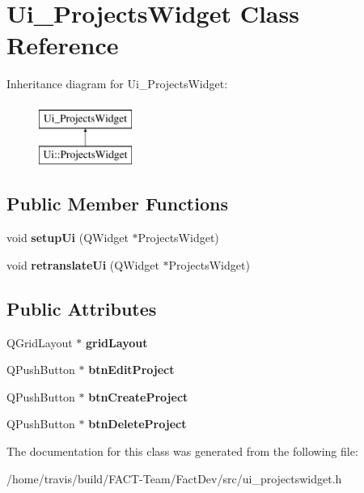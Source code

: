 \hypertarget{classUi__ProjectsWidget}{\section{Ui\-\_\-\-Projects\-Widget Class Reference}
\label{classUi__ProjectsWidget}
}
Inheritance diagram for Ui\-\_\-\-Projects\-Widget\-:\begin{figure}[H]
\begin{center}
\leavevmode
\includegraphics[height=2.000000cm]{d3/de9/classUi__ProjectsWidget}
\end{center}
\end{figure}
\subsection*{Public Member Functions}
\begin{DoxyCompactItemize}
\item 
\hypertarget{classUi__ProjectsWidget_a1235d2b943e3bea6f29ef3f060e10f99}{void {\bfseries setup\-Ui} (Q\-Widget $\ast$Projects\-Widget)}\label{classUi__ProjectsWidget_a1235d2b943e3bea6f29ef3f060e10f99}

\item 
\hypertarget{classUi__ProjectsWidget_ab26818ec75647661d182cc5725b8f439}{void {\bfseries retranslate\-Ui} (Q\-Widget $\ast$Projects\-Widget)}\label{classUi__ProjectsWidget_ab26818ec75647661d182cc5725b8f439}

\end{DoxyCompactItemize}
\subsection*{Public Attributes}
\begin{DoxyCompactItemize}
\item 
\hypertarget{classUi__ProjectsWidget_a78754d07bf4085e234a2857c9343a29d}{Q\-Grid\-Layout $\ast$ {\bfseries grid\-Layout}}\label{classUi__ProjectsWidget_a78754d07bf4085e234a2857c9343a29d}

\item 
\hypertarget{classUi__ProjectsWidget_abbf777ecb1d54dbc83be59c5916eb665}{Q\-Push\-Button $\ast$ {\bfseries btn\-Edit\-Project}}\label{classUi__ProjectsWidget_abbf777ecb1d54dbc83be59c5916eb665}

\item 
\hypertarget{classUi__ProjectsWidget_aa77ac175c580bcae8297eb19296e670b}{Q\-Push\-Button $\ast$ {\bfseries btn\-Create\-Project}}\label{classUi__ProjectsWidget_aa77ac175c580bcae8297eb19296e670b}

\item 
\hypertarget{classUi__ProjectsWidget_a5a2b448467d9601003be317169892f68}{Q\-Push\-Button $\ast$ {\bfseries btn\-Delete\-Project}}\label{classUi__ProjectsWidget_a5a2b448467d9601003be317169892f68}

\end{DoxyCompactItemize}


The documentation for this class was generated from the following file\-:\begin{DoxyCompactItemize}
\item 
/home/travis/build/\-F\-A\-C\-T-\/\-Team/\-Fact\-Dev/src/ui\-\_\-projectswidget.\-h\end{DoxyCompactItemize}
